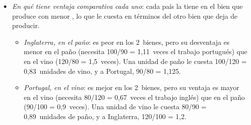 \documentclass[11pt]{article}
\begin{document}
\begin{itemize}
\item \emph{En qué tiene ventaja comparativa cada uno}: cada país la tiene en el bien que produce con menor , lo que le cuesta en términos del otro bien que deja de producir.
  \begin{itemize}
  \item \emph{Inglaterra, en el paño}: es peor en los 2~bienes, pero su desventaja es menor en el paño (necesita 100/90 = 1,11~veces el trabajo portugués) que en el vino (120/80 = 1,5~veces). Una unidad de paño le cuesta 100/120 = 0,83~unidades de vino, y a Portugal, 90/80 = 1,125.
  \item \emph{Portugal, en el vino}: es mejor en los 2~bienes, pero su ventaja es mayor en el vino (necesita 80/120 = 0,67~veces el trabajo inglés) que en el paño (90/100 = 0,9~veces). Una unidad de vino le cuesta 80/90 = 0,89~unidades de paño, y a Inglaterra, 120/100 = 1,2.
  \end{itemize}


\end{itemize}
\end{document}
